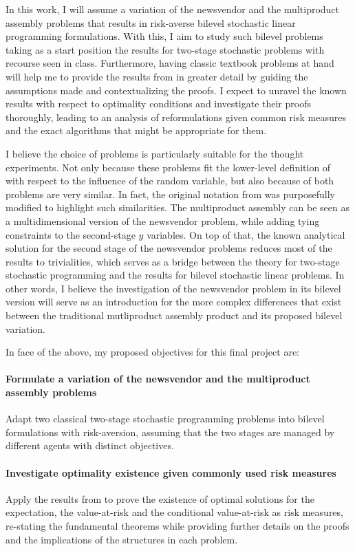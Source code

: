 \documentclass[twoside,11pt]{article}
\begin{document}
In this work, I will assume a variation of the newsvendor and the multiproduct assembly problems that results in risk-averse bilevel stochastic linear programming formulations.
With this, I aim to study such bilevel problems taking as a start position the results for two-stage stochastic problems with recourse seen in class. 
Furthermore, having classic textbook problems at hand will help me to provide the results from \citet{burtscheidtRiskAverseModelsBilevel2020} in greater detail by guiding the assumptions made and contextualizing the proofs.
I expect to unravel the known results with respect to optimality conditions and investigate their proofs thoroughly, leading to an analysis of reformulations given common risk measures and the exact algorithms that might be appropriate for them.

I believe the choice of problems is particularly suitable for the thought experiments.
Not only because these problems fit the lower-level definition of \citet{burtscheidtBilevelLinearOptimization2020} with respect to the influence of the random variable, but also because of both problems are very similar.
In fact, the original notation from \citet{shapiroLecturesStochasticProgramming2009} was purposefully modified to highlight such similarities.
The multiproduct assembly can be seen as a multidimensional version of the newsvendor problem, while adding tying constraints to the second-stage $y$ variables.
On top of that, the known analytical solution for the second stage of the newsvendor problems reduces most of the results to trivialities, which serves as a bridge between the theory for two-stage stochastic programming and the results for bilevel stochastic linear problems.
In other words, I believe the investigation of the newsvendor problem in its bilevel version will serve as an introduction for the more complex differences that exist between the traditional mutliproduct assembly product and its proposed bilevel variation.

In face of the above, my proposed objectives for this final project are:
\paragraph{Formulate a variation of the newsvendor and the multiproduct assembly problems}
Adapt two classical two-stage stochastic programming problems into bilevel formulations with risk-aversion, assuming that the two stages are managed by different agents with distinct objectives.
\paragraph{Investigate optimality existence given commonly used risk measures}
Apply the results from \citet{burtscheidtRiskAverseModelsBilevel2020} to prove the existence of optimal solutions for the expectation, the value-at-risk and the conditional value-at-risk as risk measures, re-stating the fundamental theorems while providing further details on the proofs and the implications of the structures in each problem.
\end{document}
